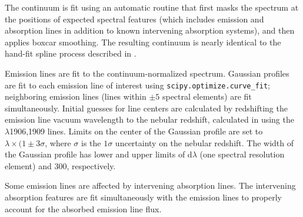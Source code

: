 


The continuum is fit using an automatic routine that first masks the spectrum at the positions of expected spectral features (which includes emission and absorption lines in addition to known intervening absorption systems), and then applies boxcar smoothing. The resulting continuum is nearly identical to the hand-fit spline process described in \citet{Rigby+2018a}.

Emission lines are fit to the continuum-normalized spectrum. Gaussian profiles are fit to each emission line of interest using {\tt scipy.optimize.curve\_fit}; neighboring emission lines (lines within $\pm 5$ spectral elements) are fit simultaneously. Initial guesses for line centers are calculated by redshifting the emission line vacuum wavelength to the nebular redshift, calculated in \citet{Rigby+2018a} using the \ciii$\lambda$1906,1909 lines. Limits on the center of the Gaussian profile are set to $\lambda \times (1 \pm 3\sigma$, where $\sigma$ is the $1\sigma$ uncertainty on the nebular redshift. The width of the Gaussian profile has lower and upper limits of d$\lambda$ (one spectral resolution element) and 300\kms, respectively.

Some emission lines are affected by intervening absorption lines. The intervening absorption features are fit simultaneously with the emission lines to properly account for the absorbed emission line flux.

